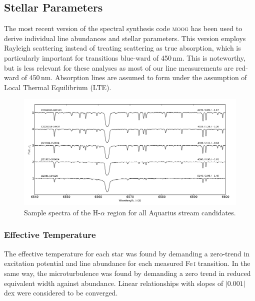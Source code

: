 \documentclass{emulateapj}
\begin{document}

\subsection{Stellar Parameters}
The most recent version of the spectral synthesis code \textsc{moog} \citep{sneden;et-al_1973} has been used to derive individual line abundances and stellar parameters. This version employs Rayleigh scattering \citep{sobeck;et-al_2011} instead of treating scattering as true absorption, which is particularly important for transitions blue-ward of 450\,nm. This is noteworthy, but is less relevant for these analyses as most of our line measurements are red-ward of 450\,nm. Absorption lines are assumed to form under the assumption of Local Thermal Equilibrium (LTE). 

\begin{figure}[t!]
	\includegraphics[width=\textwidth]{./figures/spectra-h-alpha.pdf}
	\caption{Sample spectra of the H-$\alpha$ region for all Aquarius stream candidates.}
	\label{fig:spectra-h-alpha}
\end{figure}

\subsubsection{Effective Temperature}
\label{sec:effective-teffs}
The effective temperature for each star was found by demanding a zero-trend in excitation potential and line abundance for each measured Fe\,\textsc{i} transition. In the same way, the microturbulence was found by demanding a zero trend in reduced equivalent width against abundance. Linear relationships with slopes of $|0.001|$ dex were considered to be converged. 
\end{document}
